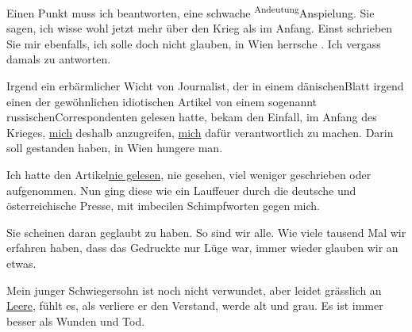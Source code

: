 \pstart
           Einen Punkt muss ich beantworten, eine schwache \substVorne{}\textsuperscript{Andeutung}\substDazwischen{}Anspielung\substHinten{}. Sie sagen, ich wisse wohl jetzt mehr über den Krieg als im Anfang. Einst
               schrieben Sie mir ebenfalls, ich solle doch nicht glauben, in Wien herrsche \label{K_L02223-2v}\label{K_L02223-2}. {\pb}Ich vergass damals zu
               antworten.\pend
           
\pstart
           Irgend ein erbärmlicher Wicht von Journalist, der in einem dänischenBlatt irgend einen der gewöhnlichen idiotischen Artikel von einem sogenannt russischenCorrespondenten gelesen
               hatte, bekam den Einfall, im Anfang des Krieges, \uline{mich}
               deshalb anzugreifen, \uline{mich} dafür verantwortlich zu
               machen. Darin soll gestanden haben, in Wien
               hungere man.\pend
           
\pstart
           Ich hatte den Artikel\uline{nie gelesen}, nie gesehen, viel weniger geschrieben
               oder aufgenommen. Nun ging diese \label{K_L02223-3v}\label{K_L02223-3}
               wie ein Lauffeuer durch die deutsche und österreichische Presse, mit imbecilen
               Schimpfworten gegen mich.\pend
           
\pstart
           Sie scheinen daran geglaubt zu haben. So sind wir alle. Wie viele tausend Mal wir
               erfahren haben, dass das Gedruckte {\pb}nur Lüge war, immer wieder glauben wir an etwas.\pend
           
\pstart
           Mein junger Schwiegersohn ist
               noch nicht verwundet, aber leidet grässlich an \uline{Leere},
               fühlt es, als verliere er den Verstand, werde alt und grau. Es ist immer besser als
               Wunden und Tod.\pend
           
